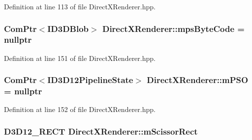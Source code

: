 Definition at line 113 of file Direct\+X\+Renderer.\+hpp.

\subsubsection[{\texorpdfstring{mps\+Byte\+Code}{mpsByteCode}}]{\setlength{\rightskip}{0pt plus 5cm}Com\+Ptr$<$I\+D3\+D\+Blob$>$ Direct\+X\+Renderer\+::mps\+Byte\+Code = nullptr\hspace{0.3cm}{\ttfamily [protected]}}\hypertarget{class_direct_x_renderer_ae01efa1365005bd544950fcbccfe6b47_ae01efa1365005bd544950fcbccfe6b47}{}\label{class_direct_x_renderer_ae01efa1365005bd544950fcbccfe6b47_ae01efa1365005bd544950fcbccfe6b47}


Definition at line 151 of file Direct\+X\+Renderer.\+hpp.

\subsubsection[{\texorpdfstring{m\+P\+SO}{mPSO}}]{\setlength{\rightskip}{0pt plus 5cm}Com\+Ptr$<$I\+D3\+D12\+Pipeline\+State$>$ Direct\+X\+Renderer\+::m\+P\+SO = nullptr\hspace{0.3cm}{\ttfamily [protected]}}\hypertarget{class_direct_x_renderer_a99d57c8ad110aeee5347e4a0baf28ae5_a99d57c8ad110aeee5347e4a0baf28ae5}{}\label{class_direct_x_renderer_a99d57c8ad110aeee5347e4a0baf28ae5_a99d57c8ad110aeee5347e4a0baf28ae5}


Definition at line 152 of file Direct\+X\+Renderer.\+hpp.

\subsubsection[{\texorpdfstring{m\+Scissor\+Rect}{mScissorRect}}]{\setlength{\rightskip}{0pt plus 5cm}D3\+D12\+\_\+\+R\+E\+CT Direct\+X\+Renderer\+::m\+Scissor\+Rect\hspace{0.3cm}{\ttfamily [protected]}}\hypertarget{class_direct_x_renderer_a67085369c1a3832355849292321bf246_a67085369c1a3832355849292321bf246}{}\label{class_direct_x_renderer_a67085369c1a3832355849292321bf246_a67085369c1a3832355849292321bf246}


